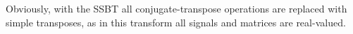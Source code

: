 Obviously, with the SSBT all conjugate-transpose operations are replaced with simple transposes, as in this transform all signals and matrices are real-valued.
%

